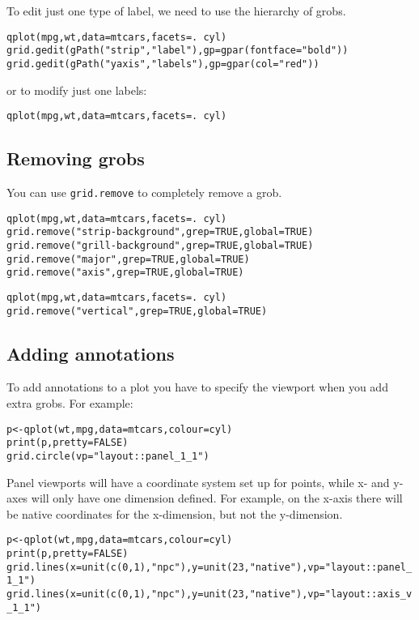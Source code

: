 
To edit just one type of label, we need to use the hierarchy of grobs.

\begin{alltt}
qplot(mpg, wt, data=mtcars, facets = . ~ cyl)
grid.gedit(gPath("strip","label"), gp=gpar(fontface="bold"))
grid.gedit(gPath("yaxis", "labels"), gp=gpar(col="red"))
\end{alltt}

or to modify just one labels:

\begin{alltt}
qplot(mpg, wt, data=mtcars, facets = . ~ cyl)
\end{alltt}

\subsection{Removing grobs}\label{ssub:removing_grobs}

You can use {\tt grid.remove} to completely remove a grob.

\begin{alltt}
qplot(mpg, wt, data=mtcars, facets = . ~ cyl)
grid.remove("strip-background", grep=TRUE, global=TRUE)
grid.remove("grill-background", grep=TRUE, global=TRUE)
grid.remove("major", grep=TRUE, global=TRUE)
grid.remove("axis", grep=TRUE, global=TRUE)

qplot(mpg, wt, data=mtcars, facets = . ~ cyl)
grid.remove("vertical", grep=TRUE, global=TRUE)
\end{alltt}

\subsection{Adding annotations}\label{sec:adding_annotation}

To add annotations to a plot you have to specify the viewport when you add extra grobs.  For example:

\begin{alltt}
p <- qplot(wt, mpg, data=mtcars, colour=cyl)
print(p, pretty=FALSE)
grid.circle(vp="layout::panel_1_1")
\end{alltt}

Panel viewports will have a coordinate system set up for points, while x- and y- axes will only have one dimension defined.  For example, on the x-axis there will be native coordinates for the x-dimension, but not the y-dimension.

\begin{alltt}
p <- qplot(wt, mpg, data=mtcars, colour=cyl)
print(p, pretty=FALSE)
grid.lines(x=unit(c(0,1), "npc"), y=unit(23, "native"), vp="layout::panel_1_1")
grid.lines(x=unit(c(0,1), "npc"), y=unit(23, "native"), vp="layout::axis_v_1_1")
\end{alltt}

